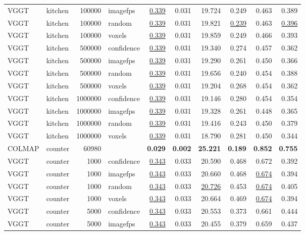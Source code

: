 \begin{table}[H]
\begin{tabular}{llrlrrrrrr}
VGGT & kitchen & 100000 & imagefps & \underline{0.339} & 0.031 & 19.724 & 0.249 & 0.463 & 0.389 \\
VGGT & kitchen & 100000 & random & \underline{0.339} & 0.031 & 19.821 & \underline{0.239} & 0.463 & \underline{0.396} \\
VGGT & kitchen & 100000 & voxels & \underline{0.339} & 0.031 & 19.859 & 0.249 & 0.466 & 0.393 \\
VGGT & kitchen & 500000 & confidence & \underline{0.339} & 0.031 & 19.340 & 0.274 & 0.457 & 0.362 \\
VGGT & kitchen & 500000 & imagefps & \underline{0.339} & 0.031 & 19.290 & 0.261 & 0.450 & 0.366 \\
VGGT & kitchen & 500000 & random & \underline{0.339} & 0.031 & 19.656 & 0.240 & 0.454 & 0.388 \\
VGGT & kitchen & 500000 & voxels & \underline{0.339} & 0.031 & 19.204 & 0.268 & 0.454 & 0.362 \\
VGGT & kitchen & 1000000 & confidence & \underline{0.339} & 0.031 & 19.146 & 0.280 & 0.454 & 0.354 \\
VGGT & kitchen & 1000000 & imagefps & \underline{0.339} & 0.031 & 19.328 & 0.261 & 0.448 & 0.365 \\
VGGT & kitchen & 1000000 & random & \underline{0.339} & 0.031 & 19.416 & 0.243 & 0.450 & 0.379 \\
VGGT & kitchen & 1000000 & voxels & \underline{0.339} & 0.031 & 18.790 & 0.281 & 0.450 & 0.344 \\
\midrule
COLMAP & counter & 60980 &  & \textbf{0.029} & \textbf{0.002} & \textbf{25.221} & \textbf{0.189} & \textbf{0.852} & \textbf{0.755} \\
VGGT & counter & 1000 & confidence & \underline{0.343} & 0.033 & 20.590 & 0.468 & 0.672 & 0.392 \\
VGGT & counter & 1000 & imagefps & \underline{0.343} & 0.033 & 20.660 & 0.468 & \underline{0.674} & 0.394 \\
VGGT & counter & 1000 & random & \underline{0.343} & 0.033 & \underline{20.726} & 0.453 & \underline{0.674} & 0.405 \\
VGGT & counter & 1000 & voxels & \underline{0.343} & 0.033 & 20.664 & 0.469 & \underline{0.674} & 0.394 \\
VGGT & counter & 5000 & confidence & \underline{0.343} & 0.033 & 20.553 & 0.373 & 0.661 & 0.444 \\
VGGT & counter & 5000 & imagefps & \underline{0.343} & 0.033 & 20.455 & 0.379 & 0.659 & 0.437 \\

\end{tabular}
\end{table}
